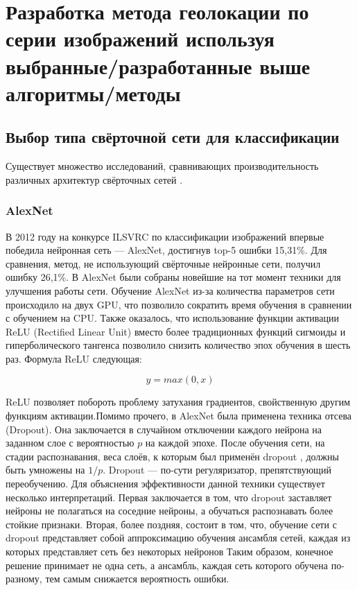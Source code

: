 \section{Разработка метода геолокации по серии изображений используя выбранные/разработанные выше алгоритмы/методы}

\subsection{Выбор типа свёрточной сети для классификации}

Существует множество исследований, сравнивающих производительность различных архитектур свёрточных сетей \cite{сикорский2017обзор}.

\subsubsection*{AlexNet}

В 2012 году на конкурсе ILSVRC по
классификации изображений впервые победила нейронная сеть — AlexNet, достигнув top-5 ошибки 15,31\%. Для сравнения, метод, не использующий свёрточные нейронные сети, получил ошибку 26,1\%. В AlexNet были собраны новейшие на тот момент техники для улучшения работы
сети.
Обучение AlexNet из-за количества параметров сети происходило на двух GPU, что позволило сократить время обучения в сравнении с обучением на CPU. Также оказалось, что
использование функции активации ReLU (Rectified Linear Unit) вместо более традиционных функций сигмоиды и гиперболического тангенса позволило снизить количество эпох обучения в шесть раз. Формула ReLU следующая:

\[y = max(0,x)\]

ReLU позволяет побороть проблему
затухания градиентов, свойственную другим
функциям активации.Помимо прочего, в AlexNet была
применена техника отсева (Dropout). Она заключается в случайном
отключении каждого нейрона на заданном
слое с вероятностью $ p $ на каждой эпохе.
После обучения сети, на стадии распознавания, веса слоёв, к которым был
применён dropout \cite{srivastava2014dropout}, должны быть умножены на
$1/p$. Dropout --- по-сути регуляризатор,
препятствующий переобучению.
Для объяснения эффективности данной техники
существует несколько интерпретаций. Первая заключается в том,
что dropout заставляет нейроны не полагаться на
соседние нейроны, а обучаться распознавать более стойкие признаки.
Вторая, более поздняя, состоит в том, что, обучение сети с dropout представляет собой
аппроксимацию обучения ансамбля сетей,
каждая из которых представляет сеть без
некоторых нейронов Таким образом, конечное решение принимает
не одна сеть, а ансамбль, каждая сеть
которого обучена по-разному, тем самым
снижается вероятность ошибки. 


